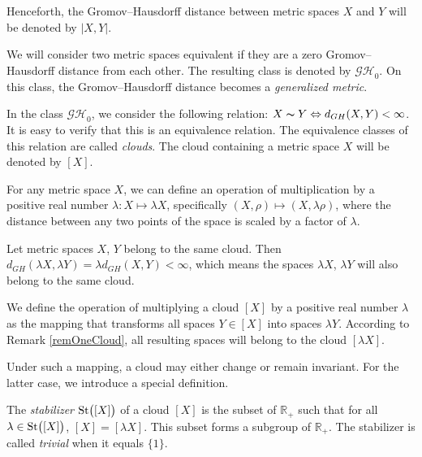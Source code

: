 \documentclass[leqno]{article}
\begin{document}
Henceforth, the Gromov--Hausdorff distance between metric spaces $ X
$ and $ Y $ will be denoted by $ |X,Y| $.

We will consider two metric spaces equivalent if they are a zero
Gromov--Hausdorff distance from each other. The resulting class is
denoted by $ \mathcal{GH}_0 $. On this class, the Gromov--Hausdorff
distance becomes a \emph{generalized metric}.

\begin{definition}
    In the class $\mathcal{GH}_{0}$, we consider the following
    relation: $X \thicksim Y \Leftrightarrow d_{GH}(X, Y) < \infty$. It
    is easy to verify that this is an equivalence relation. The
    equivalence classes of this relation are called \emph{clouds}. The
    cloud containing a metric space $X$ will be denoted by $[X]$.
\end{definition}

For any metric space $X$, we can define an operation of
multiplication by a positive real number $\lambda\colon X\mapsto
\lambda X$, specifically $(X, \rho) \mapsto (X, \lambda \rho)$, where
the distance between any two points of the space is scaled by a
factor of $\lambda$.

\begin{remark}
    Let metric spaces $X$, $Y$ belong to the same cloud. Then
    $d_{GH}(\lambda X, \lambda Y) = \lambda d_{GH}(X,Y)\allowbreak <
    \infty$, which means the spaces $\lambda X$, $\lambda Y$ will also
    belong to the same cloud.
    \label{remOneCloud}
\end{remark}

\begin{definition}
    We define the operation of multiplying a cloud $[X]$ by a positive
    real number $\lambda$ as the mapping that transforms all spaces $Y
    \in [X]$ into spaces $\lambda Y$. According to Remark
    \ref{remOneCloud}, all resulting spaces will belong to the cloud
    $[\lambda X]$.
\end{definition}

Under such a mapping, a cloud may either change or remain invariant.
For the latter case, we introduce a special definition.

\begin{definition}
    The \emph{stabilizer} $\operatorname{St}\bigl([X]\bigr)$ of a cloud $[X]$ is the
    subset of $\mathbb{R}_+$ such that for all $\lambda \in
    \operatorname{St}\bigl([X]\bigr)$, $[X] = [\lambda X]$. This subset forms a
    subgroup of $\mathbb{R}_+$. The stabilizer is called \emph{trivial}
    when it equals $\{1\}$.
\end{definition}
\end{document}
